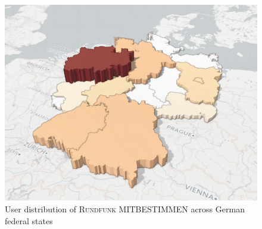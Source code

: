 \documentclass{article}
\newcommand{\rufu}{\textsc{Rundfunk MITBESTIMMEN}}
\begin{document}
\begin{figure}[h!]
  \centering
  \includegraphics[width=\textwidth]{images/ua_example.png}
  \caption{User distribution of \rufu{} across German federal states}
  \label{fig:implementation:user_distribution}
\end{figure}


\clearpage
\printbibliography
\end{document}
